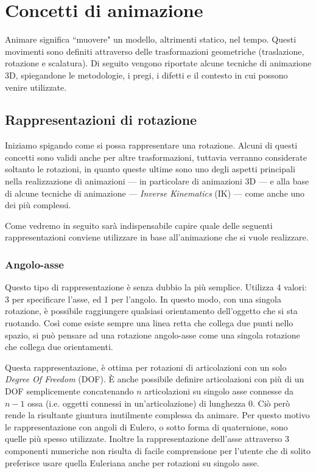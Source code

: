 

\chapter{Concetti di animazione} %

\label{Chapter3} %

Animare significa ``muovere" un modello, altrimenti statico, nel tempo. Questi movimenti sono definiti attraverso delle trasformazioni geometriche (traslazione, rotazione e scalatura).
Di seguito vengono riportate alcune tecniche di animazione 3D, spiegandone le metodologie, i pregi, i difetti e il contesto in cui possono venire utilizzate. 


\section{Rappresentazioni di rotazione}\label{Section3.1}
Iniziamo spigando come si possa rappresentare una rotazione. Alcuni di questi concetti sono validi anche per altre trasformazioni, tuttavia verranno considerate soltanto le rotazioni, in quanto queste ultime sono uno degli aspetti principali nella realizzazione di animazioni --- in particolare di animazioni 3D --- e alla base di alcune tecniche di animazione --- \emph{Inverse Kinematics} (IK) --- come anche uno dei più complessi. 

Come vedremo in seguito sarà indispensabile capire quale delle seguenti rappresentazioni conviene utilizzare in base all'animazione che si vuole realizzare.


\subsection{Angolo-asse}
Questo tipo di rappresentazione è senza dubbio la più semplice.
Utilizza 4 valori: 3 per specificare l'asse, ed 1 per l'angolo. In questo modo, con una singola rotazione, è possibile raggiungere qualsiasi orientamento dell'oggetto che si sta ruotando. Così come esiste sempre una linea retta che collega due punti nello spazio, si può pensare ad una rotazione angolo-asse come una singola rotazione che collega due orientamenti.

Questa rappresentazione, è ottima per rotazioni di articolazioni con un solo \emph{Degree Of Freedom} (DOF). È anche possibile definire articolazioni con più di un DOF semplicemente concatenando $n$ articolazioni su singolo asse connesse da $n-1$ ossa (i.e. oggetti connessi in un'articolazione) di lunghezza 0. Ciò però rende la risultante giuntura inutilmente complessa da animare. Per questo motivo le rappresentazione con angoli di Eulero, o sotto forma di quaternione, sono quelle più spesso utilizzate. Inoltre la rappresentazione dell'asse attraverso 3 componenti numeriche non risulta di facile comprensione per l'utente che di solito preferisce usare quella Euleriana anche per rotazioni su singolo asse.

